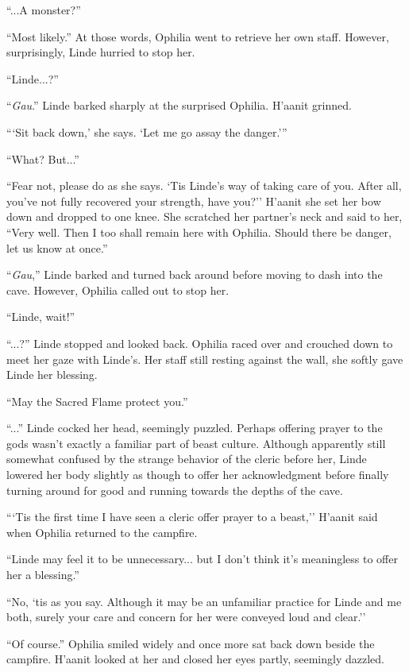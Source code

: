 ``...A monster?''

``Most likely.'' At those words, Ophilia went to retrieve her own staff. However, surprisingly, Linde hurried to stop her.

``Linde...?''

``\emph{Gau}.'' Linde barked sharply at the surprised Ophilia. H'aanit grinned.

```Sit back down,' she says. `Let me go assay the danger.'''

``What? But...''

``Fear not, please do as she says. `Tis Linde's way of taking care of you. After all, you've not fully recovered your strength, have you?'' H'aanit she set her bow down and dropped to one knee. She scratched her partner's neck and said to her, ``Very well. Then I too shall remain here with Ophilia. Should there be danger, let us know at once.''

``\emph{Gau},'' Linde barked and turned back around before moving to dash into the cave. However, Ophilia called out to stop her.

``Linde, wait!''

``...?'' Linde stopped and looked back. Ophilia raced over and crouched down to meet her gaze with Linde's. Her staff still resting against the wall, she softly gave Linde her blessing.

``May the Sacred Flame protect you.''

``...'' Linde cocked her head, seemingly puzzled. Perhaps offering prayer to the gods wasn't exactly a familiar part of beast culture. Although apparently still somewhat confused by the strange behavior of the cleric before her, Linde lowered her body slightly as though to offer her acknowledgment before finally turning around for good and running towards the depths of the cave.

```Tis the first time I have seen a cleric offer prayer to a beast,'' H'aanit said when Ophilia returned to the campfire.

``Linde may feel it to be unnecessary... but I don't think it's meaningless to offer her a blessing.''

``No, `tis as you say. Although it may be an unfamiliar practice for Linde and me both, surely your care and concern for her were conveyed loud and clear.''

``Of course.'' Ophilia smiled widely and once more sat back down beside the campfire. H'aanit looked at her and closed her eyes partly, seemingly dazzled.

